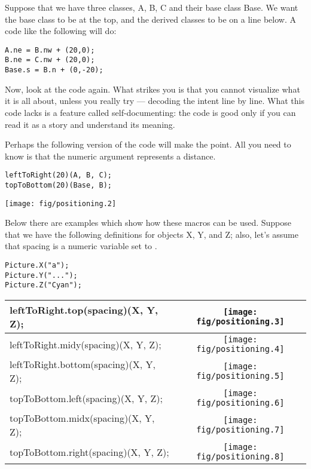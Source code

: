 \documentclass{article}
\newcommand{\code}{\ttfamily}
\begin{document}
Suppose that we have three classes, {\code A}, {\code B}, {\code C} and their base class
{\code Base}. We want the base class to be at the top, and the derived classes to be
on a line below. A code like the following will do:

\begin{verbatim}
A.ne = B.nw + (20,0);
B.ne = C.nw + (20,0);
Base.s = B.n + (0,-20);
\end{verbatim}

Now, look at the code again. What strikes you is that you cannot visualize what it is all about, unless you really try --- decoding the intent line by line. What this code lacks is a feature called self-documenting: the code is good only if you can read it as a story and understand its meaning.

Perhaps the following version of the code will make the point. All you need to know is that the numeric argument represents a distance.

\begin{multicols}{2}
\begin{verbatim}
leftToRight(20)(A, B, C);
topToBottom(20)(Base, B);
\end{verbatim}
\columnbreak
\hspace{1cm}\texttt{[image: fig/positioning.2]}
\end{multicols}

Below there are examples which show how these macros can be used. Suppose that we have the following definitions for objects {\code X}, {\code Y}, and {\code Z}; also, let's assume that {\code spacing} is a numeric variable set to {\code 5}.

\begin{verbatim}
Picture.X("a");
Picture.Y("...");
Picture.Z("Cyan");
\end{verbatim}

\begin{tabular}{||l|c||}
\hline
{\code leftToRight.top(spacing)(X, Y, Z);} & \texttt{[image: fig/positioning.3]} \\
\hline
{\code leftToRight.midy(spacing)(X, Y, Z);} & \texttt{[image: fig/positioning.4]} \\
\hline
{\code leftToRight.bottom(spacing)(X, Y, Z);} & \texttt{[image: fig/positioning.5]} \\
\hline
{\code topToBottom.left(spacing)(X, Y, Z);} & \texttt{[image: fig/positioning.6]} \\
\hline
{\code topToBottom.midx(spacing)(X, Y, Z);} & \texttt{[image: fig/positioning.7]} \\
\hline
{\code topToBottom.right(spacing)(X, Y, Z);} & \texttt{[image: fig/positioning.8]} \\
\hline
\end{tabular} \\
\end{document}
